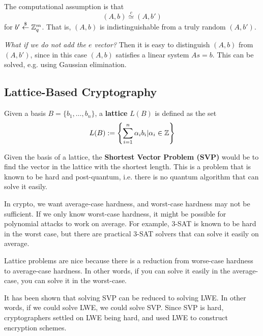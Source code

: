 The computational assumption is that
\[(A, b)\overset{c}{\simeq} (A, b')\]
for $b'\overset{\$}{\leftarrow} \mathbb Z_q^m$. That is, $(A, b)$ is indistinguishable from a truly random $(A, b')$.

\begin{center}
    \def\svgwidth{0.5\columnwidth}
    
\end{center}

\begin{remark}
    \textit{What if we do not add the $e$ vector?} Then it is easy to distinguish $(A, b)$ from $(A, b')$, since in this case $(A, b)$ satisfies a linear system $As = b$. This can be solved, e.g. using Gaussian elimination.
\end{remark}

\subsection{Lattice-Based Cryptography}

\begin{definition}
    Given a basis $B = \{ b_1, \dots, b_n\}$, a \textbf{lattice} $L(B)$ is defined as the set
    \[ L(B) := \left\{ \sum_{i=1}^n \alpha_i b_i | \alpha_i \in \mathbb Z \right\}\]

    \begin{center}
        \def\svgwidth{0.5\columnwidth}
        
    \end{center}
\end{definition}

Given the basis of a lattice, the \textbf{Shortest Vector Problem (SVP)} would be to find the vector in the lattice with the shortest length. This is a problem that is known to be hard and post-quantum, i.e. there is no quantum algorithm that can solve it easily.

In crypto, we want average-case hardness, and worst-case hardness may not be sufficient. If we only know worst-case hardness, it might be possible for polynomial attacks to work on average. For example, 3-SAT is known to be hard in the worst case, but there are practical 3-SAT solvers that can solve it easily on average.

Lattice problems are nice because there is a reduction from worse-case hardness to average-case hardness. In other words, if you can solve it easily in the average-case, you can solve it in the worst-case.

It has been shown that solving SVP can be reduced to solving LWE. In other words, if we could solve LWE, we could solve SVP. Since SVP is hard, cryptographers settled on LWE being hard, and used LWE to construct encryption schemes.

